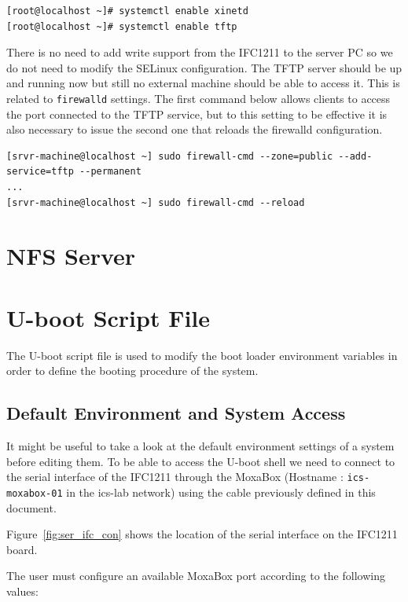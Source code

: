 \documentclass[11pt
  , a4paper
  , article
  , oneside
  , showtrims
]{memoir}
\begin{document}
\begin{lstlisting}[style=termstyle]
[root@localhost ~]# systemctl enable xinetd
[root@localhost ~]# systemctl enable tftp
\end{lstlisting}

There is no need to add write support from the IFC1211 to the server PC so we do not need to modify the SELinux configuration.
The TFTP server should be up and running now but still no external machine should be able to access it. This is related to \texttt{firewalld} settings. 
The first command below allows clients to access the port connected to the TFTP service, but to this setting to be effective it is also necessary to issue the second one that reloads the firewalld configuration.

\begin{lstlisting}[style=termstyle]
[srvr-machine@localhost ~] sudo firewall-cmd --zone=public --add-service=tftp --permanent
...
[srvr-machine@localhost ~] sudo firewall-cmd --reload
\end{lstlisting}


\section{NFS Server}
\fi

\section{U-boot Script File}
The U-boot script file is used to modify the boot loader environment variables in order to define the booting procedure of the system.

\subsection{Default Environment and System Access}
It might be useful to take a look at the default environment settings of a system before editing them. To be able to access the U-boot shell we need to connect to the serial interface of the IFC1211 through the MoxaBox (Hostname : \texttt{ics-moxabox-01} in the ics-lab network) using the cable previously defined in this document.

Figure~\ref{fig:ser_ifc_con} shows the location of the serial interface on the IFC1211 board.

The user must configure an available MoxaBox port according to the following values:
\end{document}
